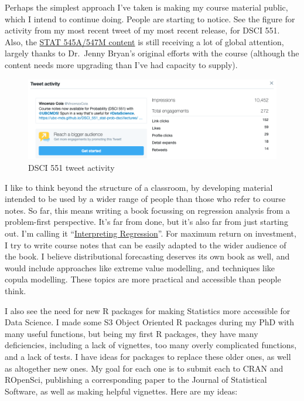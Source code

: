 \documentclass[]{article}
\begin{document}
Perhaps the simplest approach I've taken is making my course material public, which I intend to continue doing. People are starting to notice. See the figure for activity from my most recent tweet of my most recent release, for DSCI 551. Also, the \href{https://stat545guidebook.netlify.com/}{STAT 545A/547M content} is still receiving a lot of global attention, largely thanks to Dr.~Jenny Bryan's original efforts with the course (although the content needs more upgrading than I've had capacity to supply).

\begin{figure}
\centering
\includegraphics{./img/551_tweet.png}
\caption{DSCI 551 tweet activity}
\end{figure}

I like to think beyond the structure of a classroom, by developing material intended to be used by a wider range of people than those who refer to course notes. So far, this means writing a book focussing on regression analysis from a problem-first perspective. It's far from done, but it's also far from just starting out. I'm calling it ``\href{https://interpreting-regression.netlify.com/}{Interpreting Regression}''. For maximum return on investment, I try to write course notes that can be easily adapted to the wider audience of the book. I believe distributional forecasting deserves its own book as well, and would include approaches like extreme value modelling, and techniques like copula modelling. These topics are more practical and accessible than people think.

I also see the need for new R packages for making Statistics more accessible for Data Science. I made some S3 Object Oriented R packages during my PhD with many useful functions, but being my first R packages, they have many deficiencies, including a lack of vignettes, too many overly complicated functions, and a lack of tests. I have ideas for packages to replace these older ones, as well as altogether new ones. My goal for each one is to submit each to CRAN and ROpenSci, publishing a corresponding paper to the Journal of Statistical Software, as well as making helpful vignettes. Here are my ideas:
\end{document}

